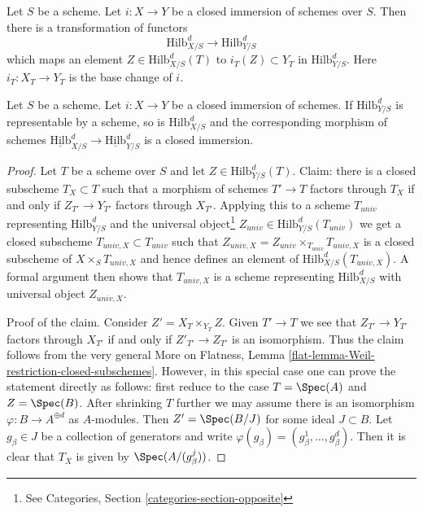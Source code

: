 \noindent
Let $S$ be a scheme. Let $i : X \to Y$ be a closed immersion of schemes
over $S$. Then there is a transformation of functors
$$
\text{Hilb}^d_{X/S} \longrightarrow \text{Hilb}^d_{Y/S}
$$
which maps an element $Z \in \text{Hilb}^d_{X/S}(T)$ to
$i_T(Z) \subset Y_T$ in $\text{Hilb}^d_{Y/S}$. Here $i_T : X_T \to Y_T$
is the base change of $i$.

\begin{lemma}
\label{lemma-hilb-d-of-closed}
Let $S$ be a scheme. Let $i : X \to Y$ be a closed immersion of schemes.
If $\text{Hilb}^d_{Y/S}$ is representable by a scheme, so is
$\text{Hilb}^d_{X/S}$ and the corresponding morphism of schemes
$\underline{\text{Hilb}}^d_{X/S} \to \underline{\text{Hilb}}^d_{Y/S}$
is a closed immersion.
\end{lemma}

\begin{proof}
Let $T$ be a scheme over $S$ and let $Z \in \text{Hilb}^d_{Y/S}(T)$.
Claim: there is a closed subscheme $T_X \subset T$ such
that a morphism of schemes $T' \to T$ factors through $T_X$ if
and only if $Z_{T'} \to Y_{T'}$ factors through $X_{T'}$.
Applying this to a scheme $T_{univ}$ representing $\text{Hilb}^d_{Y/S}$ and the
universal object\footnote{See
Categories, Section \ref{categories-section-opposite}}
$Z_{univ} \in \text{Hilb}^d_{Y/S}(T_{univ})$
we get a closed subscheme $T_{univ, X} \subset T_{univ}$ such that
$Z_{univ, X} = Z_{univ} \times_{T_{univ}} T_{univ, X}$
is a closed subscheme of $X \times_S T_{univ, X}$ and hence
defines an element of $\text{Hilb}^d_{X/S}(T_{univ, X})$.
A formal argument then shows that $T_{univ, X}$ is a scheme
representing $\text{Hilb}^d_{X/S}$ with universal object $Z_{univ, X}$.

\medskip\noindent
Proof of the claim. Consider $Z' = X_T \times_{Y_T} Z$. Given $T' \to T$
we see that $Z_{T'} \to Y_{T'}$ factors through $X_{T'}$ if and
only if $Z'_{T'} \to Z_{T'}$ is an isomorphism. Thus the claim follows
from the very general
More on Flatness, Lemma \ref{flat-lemma-Weil-restriction-closed-subschemes}.
However, in this special case one can prove the statement directly as
follows: first reduce to the case $T = \Spec(A)$ and $Z = \Spec(B)$.
After shrinking $T$ further we may assume there is an isomorphism
$\varphi : B \to A^{\oplus d}$ as $A$-modules. Then $Z' = \Spec(B/J)$
for some ideal $J \subset B$. Let $g_\beta \in J$ be a collection of
generators and write $\varphi(g_\beta) = (g_\beta^1, \ldots, g_\beta^d)$.
Then it is clear that $T_X$ is given by $\Spec(A/(g_\beta^j))$.
\end{proof}


